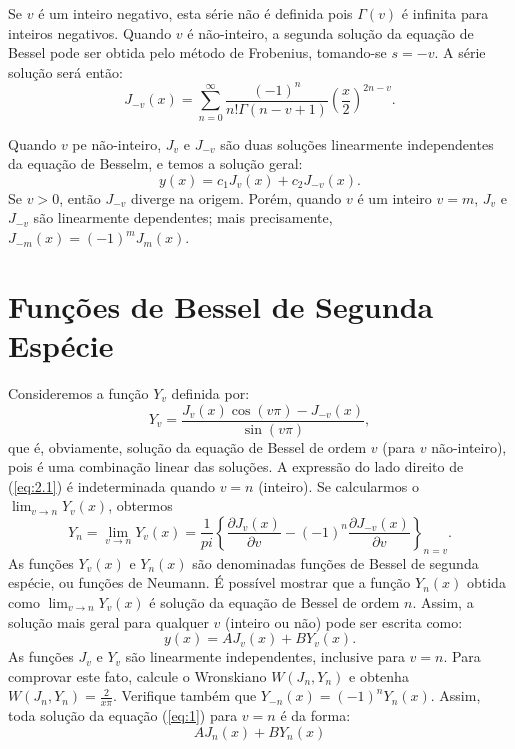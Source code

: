 \documentclass[10pt,a4paper]{article}
\newcommand{\prt}[1]{\left(#1\right)}
\newcommand{\chv}[1]{\left\{#1\right\}}
\let\oldcos\cos
\let\oldsin\sin
\renewcommand{\cos}[1]{\oldcos{\prt{#1}}}
\renewcommand{\sin}[1]{\oldsin{\prt{#1}}}
\begin{document}
	Se $v$ é um inteiro negativo, esta série não é definida pois $\Gamma(v)$ é infinita para inteiros negativos. Quando $v$ é não-inteiro, a segunda solução da equação de Bessel pode ser obtida pelo método de Frobenius, tomando-se $s=-v$. A série solução será então:
	\begin{equation}
		J_{-v}(x) = \sum_{n=0}^\infty \frac{(-1)^n}{n!\Gamma(n-v+1)}\prt{\frac{x}{2}}^{2n-v}.
	\end{equation}
	
	Quando $v$ pe não-inteiro, $J_v$ e $J_{-v}$ são duas soluções linearmente independentes da equação de Besselm, e temos a solução geral:
	\[y(x) = c_1J_v(x) + c_2J_{-v}(x).\]
	Se $v>0$, então $J_{-v}$ diverge na origem. Porém, quando $v$ é um inteiro $v=m$, $J_v$ e $J_{-v}$ são linearmente dependentes; mais precisamente, $J_{-m}(x)=(-1)^mJ_m(x)$.
	
	\section{Funções de Bessel de Segunda Espécie}
	Consideremos a função $Y_v$ definida por:
	\begin{equation}
		Y_v = \frac{J_v(x)\cos{v\pi}-J_{-v}(x)}{\sin{v\pi}},
		\label{eq:2.1}
	\end{equation}
	que é, obviamente, solução da equação de Bessel de ordem $v$ (para $v$ não-inteiro), pois é uma combinação linear das soluções. A expressão do lado direito de (\ref{eq:2.1}) é indeterminada quando $v=n$ (inteiro). Se calcularmos o $\lim_{v\rightarrow n}Y_v(x)$, obtermos
	\[Y_n = \lim_{v\rightarrow n} Y_v(x) = \frac{1}{pi}\chv{\frac{\partial J_v(x)}{\partial v} -(-1)^n \frac{\partial J_{-v}(x)}{\partial v}}_{n=v}.\]
	As funções $Y_v(x)$ e $Y_n(x)$ são denominadas funções de Bessel de segunda espécie, ou funções de Neumann. É possível mostrar que a função $Y_n(x)$ obtida como $\lim_{v\rightarrow n} Y_v(x)$ é solução da equação de Bessel de ordem $n$. Assim, a solução mais geral para qualquer $v$ (inteiro ou não) pode ser escrita como:
	\[y(x) = AJ_v(x) + BY_v(x).\]
	As funções $J_v$ e $Y_v$ são linearmente independentes, inclusive para $v=n$. Para comprovar este fato, calcule o Wronskiano $W(J_n,Y_n)$ e obtenha $W(J_n,Y_n)=\frac{2}{x\pi}$. Verifique também que $Y_{-n}(x)=(-1)^nY_n(x)$. Assim, toda solução da equação (\ref{eq:1}) para $v=n$ é da forma:
	\[AJ_n(x) + BY_n(x)\]
\end{document}
